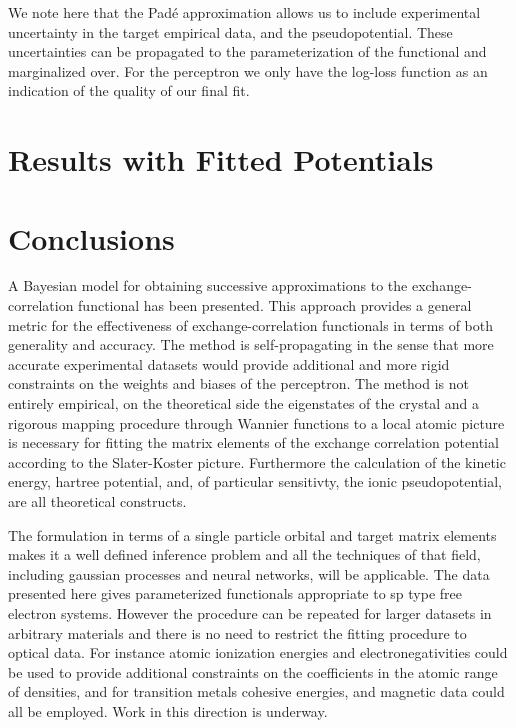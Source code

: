 We note here that the Pad\'e approximation allows us to include experimental uncertainty 
in the target empirical data, and the pseudopotential. These uncertainties can be propagated to the 
parameterization of the functional and marginalized over. For the perceptron we only have the 
log-loss function as an indication of the quality of our final fit.

\section{Results with Fitted Potentials}

\section{Conclusions}
A Bayesian model for obtaining successive approximations to the exchange-correlation functional
has been presented. This approach provides a general metric for the effectiveness of exchange-correlation
functionals in terms of both generality and accuracy. The method is self-propagating in the
sense that more accurate experimental datasets would provide additional and more rigid constraints 
on the weights and biases of the perceptron. The method is not entirely empirical, on the theoretical side
the eigenstates of the crystal and a rigorous mapping procedure through Wannier functions to a local atomic picture
is necessary for fitting the matrix elements of the exchange correlation potential 
according to the Slater-Koster picture. Furthermore the calculation of the kinetic energy, hartree potential, and,
of particular sensitivty, the ionic pseudopotential, are all theoretical constructs.

The formulation in terms of a single particle orbital and 
target matrix elements makes it a well defined inference
problem and all the techniques of that field, including gaussian processes and neural networks, 
will be applicable. The data presented here gives parameterized functionals appropriate to 
sp type free electron systems. However the procedure can be repeated for larger 
datasets in arbitrary materials and there is no need to restrict the fitting 
procedure to optical data. For instance atomic ionization 
energies and electronegativities could be used to provide additional constraints on the 
coefficients in the atomic range of densities, and for transition metals 
cohesive energies, and magnetic data could all be employed. Work in this direction is underway.


